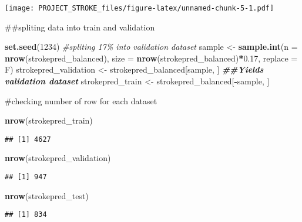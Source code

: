\documentclass[
]{article}
\newenvironment{Shaded}{\begin{snugshade}}{\end{snugshade}}
\newcommand{\AttributeTok}[1]{\textcolor[rgb]{0.13,0.29,0.53}{#1}}
\newcommand{\CommentTok}[1]{\textcolor[rgb]{0.56,0.35,0.01}{\textit{#1}}}
\newcommand{\DecValTok}[1]{\textcolor[rgb]{0.00,0.00,0.81}{#1}}
\newcommand{\DocumentationTok}[1]{\textcolor[rgb]{0.56,0.35,0.01}{\textbf{\textit{#1}}}}
\newcommand{\FloatTok}[1]{\textcolor[rgb]{0.00,0.00,0.81}{#1}}
\newcommand{\FunctionTok}[1]{\textcolor[rgb]{0.13,0.29,0.53}{\textbf{#1}}}
\newcommand{\NormalTok}[1]{#1}
\newcommand{\OtherTok}[1]{\textcolor[rgb]{0.56,0.35,0.01}{#1}}
\newcommand{\SpecialCharTok}[1]{\textcolor[rgb]{0.81,0.36,0.00}{\textbf{#1}}}
\begin{document}
\texttt{[image: PROJECT\_STROKE\_files/figure-latex/unnamed-chunk-5-1.pdf]}

\#\#spliting data into train and validation

\begin{Shaded}
\begin{Highlighting}[]
\FunctionTok{set.seed}\NormalTok{(}\DecValTok{1234}\NormalTok{)}
\CommentTok{\#spliting 17\% into validation dataset}
\NormalTok{sample }\OtherTok{\textless{}{-}} \FunctionTok{sample.int}\NormalTok{(}\AttributeTok{n =} \FunctionTok{nrow}\NormalTok{(strokepred\_balanced), }\AttributeTok{size =} \FunctionTok{nrow}\NormalTok{(strokepred\_balanced)}\SpecialCharTok{*}\FloatTok{0.17}\NormalTok{, }\AttributeTok{replace =}\NormalTok{ F)}
\NormalTok{strokepred\_validation }\OtherTok{\textless{}{-}}\NormalTok{ strokepred\_balanced[sample, ] }\DocumentationTok{\#\#Yields validation dataset}
\NormalTok{strokepred\_train }\OtherTok{\textless{}{-}}\NormalTok{ strokepred\_balanced[}\SpecialCharTok{{-}}\NormalTok{sample, ]}
\end{Highlighting}
\end{Shaded}

\#checking number of row for each dataset

\begin{Shaded}
\begin{Highlighting}[]
\FunctionTok{nrow}\NormalTok{(strokepred\_train)}
\end{Highlighting}
\end{Shaded}

\begin{verbatim}
## [1] 4627
\end{verbatim}

\begin{Shaded}
\begin{Highlighting}[]
\FunctionTok{nrow}\NormalTok{(strokepred\_validation)}
\end{Highlighting}
\end{Shaded}

\begin{verbatim}
## [1] 947
\end{verbatim}

\begin{Shaded}
\begin{Highlighting}[]
\FunctionTok{nrow}\NormalTok{(strokepred\_test)}
\end{Highlighting}
\end{Shaded}

\begin{verbatim}
## [1] 834
\end{verbatim}
\end{document}
